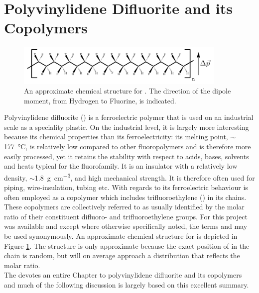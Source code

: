 \section{Polyvinylidene Difluorite and its Copolymers}
\begin{figure}[h]
\centering
	\includegraphics[width=0.9\textwidth]{./figs/chap1/pvdfstruct}
	\caption{An approximate chemical structure for \pvtr{}. The direction of the dipole moment, from Hydrogen to Fluorine, is indicated.}
	\label{fig:pvstruct}
\end{figure}
Polyvinylidene difluorite (\pvdf{}) is a ferroelectric polymer that is used on an industrial scale as a speciality plastic. On the industrial level, it is largely more interesting because its chemical properties than its ferroelectricity: its melting point, $\sim$\SI{177}{\degreeCelsius}, is relatively low compared to other fluoropolymers and is therefore more easily processed, yet it retains the stability with respect to acids, bases, solvents and heats typical for the fluorofamily. It is an insulator with a relatively low density, $\sim$\SI{1.8}{\gram\per\cubic\centi\metre}, and high mechanical strength. It is therefore often used for piping, wire-insulation, tubing etc. With regards to its ferroelectric behaviour \pvdf{} is often employed as a copolymer which includes trifluoroethylene (\trfe{}) in its chains. These copolymers are collectively referred to as \pvfe{} usually identified by the molar ratio of their constituent difluoro- and trifluoroethylene groups. For this project \pvtr{} was available and except where otherwise specifically noted, the terms \pvdf{} and \pvtr{} may be used synonymously. An approximate chemical structure for \pvtr{} is depicted in Figure \ref{fig:pvstruct}. The structure is only approximate because the exact position of \trfe{} in the chain is random, but will on average approach a distribution that reflects the molar ratio.\\
The \emph{} devotes an entire Chapter to polyvinylidene difluorite and its copolymers~\cite[pp. 807-820]{encyclopedia} and much of the following discussion is largely based on this excellent summary.\\
